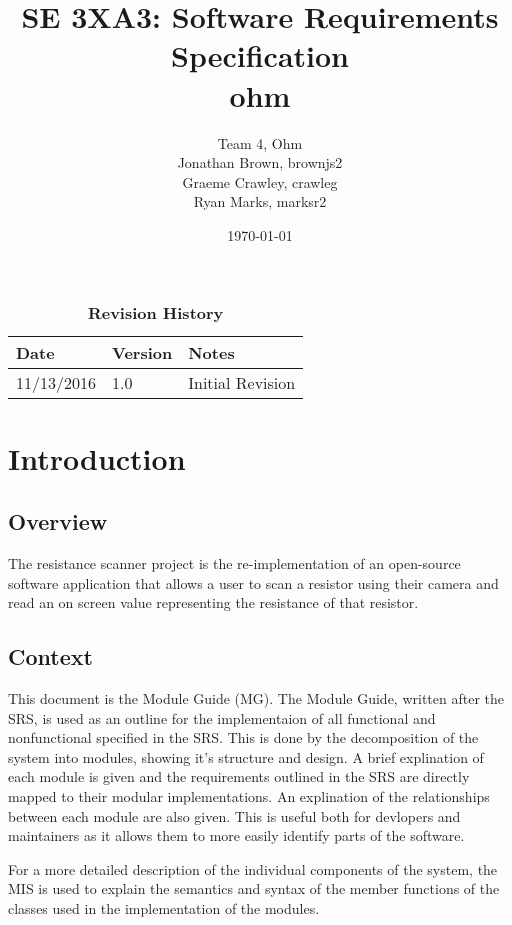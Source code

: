 \documentclass[12pt, titlepage]{article}
\title{SE 3XA3: Software Requirements Specification\\ ohm}
\author{Team 4, Ohm
		\\ Jonathan Brown, brownjs2
		\\ Graeme Crawley, crawleg
		\\ Ryan Marks, marksr2
}
\date{\today}
\begin{document}
\maketitle

\tableofcontents
\listoftables
\listoffigures

\begin{table}[bp]
\caption{\bf Revision History}
\begin{tabularx}{\textwidth}{p{3cm}p{2cm}X}
\toprule {\bf Date} & {\bf Version} & {\bf Notes}\\
\midrule
11/13/2016 & 1.0 & Initial Revision\\
\bottomrule
\end{tabularx}
\end{table}

\newpage


\section{Introduction}
\subsection{Overview}
The resistance scanner project is the re-implementation of an open-source software application that allows a user to scan a resistor using their camera and read an on screen value representing the resistance of that resistor.

\subsection{Context}
\par This document is the Module Guide (MG). The Module Guide, written after the SRS, is used as an outline for the implementaion of all functional and nonfunctional specified in the SRS. This is done by the decomposition of the system into modules, showing it's structure and design. A brief explination of each module is given and the requirements outlined in the SRS are directly mapped to their modular implementations. An explination of the relationships between each module are also given. This is useful both for devlopers and maintainers as it allows them to more easily identify parts of the software.
\par For a more detailed description of the individual components of the system, the MIS is used to explain the semantics and syntax of the member functions of the classes used in the implementation of the modules.
\end{document}
